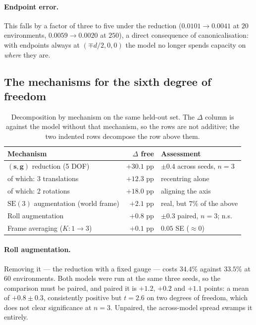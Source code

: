 \documentclass[11pt,a4paper]{article}
\newcommand{\toprule}{\hline}
\newcommand{\midrule}{\hline}
\newcommand{\bottomrule}{\hline}
\newcommand{\svec}{\mathbf{s}}
\newcommand{\gvec}{\mathbf{g}}
\newcommand{\SE}{\mathrm{SE}(3)}
\begin{document}
\paragraph{Endpoint error.} This falls by a factor of three to five under the
reduction ($0.0101 \to 0.0041$ at $20$ environments, $0.0059 \to 0.0020$ at
$250$), a direct consequence of canonicalisation: with endpoints always at
$(\mp d/2, 0, 0)$ the model no longer spends capacity on \emph{where} they are.

\subsection{The mechanisms for the sixth degree of freedom}
\label{sec:mechanisms}

\begin{table}[t]
\centering
\begin{tabular}{lrl}
\toprule
Mechanism & $\Delta$ free & Assessment \\
\midrule
$(\svec,\gvec)$ reduction (5 DOF) & $+30.1$ pp & $\pm0.4$ across seeds, $n{=}3$ \\
\quad of which: 3 translations    & $+12.3$ pp & recentring alone \\
\quad of which: 2 rotations       & $+18.0$ pp & aligning the axis \\
$\SE$ augmentation (world frame)  & $+2.1$ pp  & real, but $7\%$ of the above \\
Roll augmentation                 & $+0.8$ pp  & $\pm0.3$ paired, $n{=}3$; n.s. \\
Frame averaging ($K{:}1\!\to\!3$) & $+0.1$ pp  & $0.05$ SE ($\approx 0$) \\
\bottomrule
\end{tabular}
\caption{Decomposition by mechanism on the same held-out set. The $\Delta$ column
is against the model without that mechanism, so the rows are not additive; the two
indented rows decompose the row above them.}
\label{tab:ablation}
\end{table}

\paragraph{Roll augmentation.} Removing it --- the reduction with a fixed gauge
--- costs $34.4\%$ against $33.5\%$ at $60$ environments. Both models were run at
the same three seeds, so the comparison must be paired, and paired it is $+1.2$,
$+0.2$ and $+1.1$ points: a mean of $+0.8 \pm 0.3$, consistently positive but
$t = 2.6$ on two degrees of freedom, which does not clear significance at $n=3$.
Unpaired, the across-model spread swamps it entirely.
\end{document}
